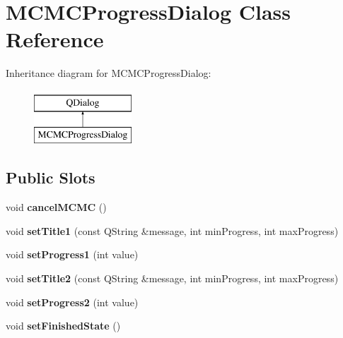 \hypertarget{class_m_c_m_c_progress_dialog}{\section{M\-C\-M\-C\-Progress\-Dialog Class Reference}
\label{class_m_c_m_c_progress_dialog}
}
Inheritance diagram for M\-C\-M\-C\-Progress\-Dialog\-:\begin{figure}[H]
\begin{center}
\leavevmode
\includegraphics[height=2.000000cm]{class_m_c_m_c_progress_dialog}
\end{center}
\end{figure}
\subsection*{Public Slots}
\begin{DoxyCompactItemize}
\item 
\hypertarget{class_m_c_m_c_progress_dialog_a0cd75717ccf6c69925adf587ed5d4500}{void {\bfseries cancel\-M\-C\-M\-C} ()}\label{class_m_c_m_c_progress_dialog_a0cd75717ccf6c69925adf587ed5d4500}

\item 
\hypertarget{class_m_c_m_c_progress_dialog_ac18b4b7d1256ae417a9a009d589b5f22}{void {\bfseries set\-Title1} (const Q\-String \&message, int min\-Progress, int max\-Progress)}\label{class_m_c_m_c_progress_dialog_ac18b4b7d1256ae417a9a009d589b5f22}

\item 
\hypertarget{class_m_c_m_c_progress_dialog_ad61360de344cd8be3daff9bf1801f611}{void {\bfseries set\-Progress1} (int value)}\label{class_m_c_m_c_progress_dialog_ad61360de344cd8be3daff9bf1801f611}

\item 
\hypertarget{class_m_c_m_c_progress_dialog_a8b0f71efb6d2ee5739616cd46216d062}{void {\bfseries set\-Title2} (const Q\-String \&message, int min\-Progress, int max\-Progress)}\label{class_m_c_m_c_progress_dialog_a8b0f71efb6d2ee5739616cd46216d062}

\item 
\hypertarget{class_m_c_m_c_progress_dialog_a97258fd6dd937ffcbcb86081bff54f4a}{void {\bfseries set\-Progress2} (int value)}\label{class_m_c_m_c_progress_dialog_a97258fd6dd937ffcbcb86081bff54f4a}

\item 
\hypertarget{class_m_c_m_c_progress_dialog_aeab6c40b45dce831df0970861a953f93}{void {\bfseries set\-Finished\-State} ()}\label{class_m_c_m_c_progress_dialog_aeab6c40b45dce831df0970861a953f93}

\end{DoxyCompactItemize}
